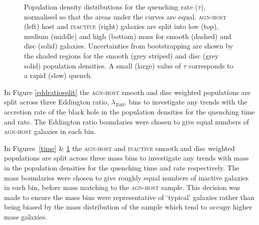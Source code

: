 \begin{figure}
\caption[Quenching rate population density distributions for the \textsc{agn-host} and \textsc{inactive} samples]{Population density distributions for the quenching rate ($\tau$), normalised so that the areas under the curves are equal. \textsc{agn-host} (left) host and \textsc{inactive} (right) galaxies are split into low (top), medium (middle) and high (bottom) mass for smooth (dashed) and disc (solid) galaxies. Uncertainties from bootstrapping are shown by the shaded regions for the smooth (grey striped) and disc (grey solid) population densities. A small (large) value of $\tau$ corresponds to a rapid (slow) quench.}
\label{rate}
\end{figure}



In Figure \ref{eddratiosplit} the \textsc{agn-host} smooth and disc weighted populations are split across three Eddington ratio, $\lambda_{Edd}$, bins to investigate any trends with the accretion rate of the black hole in the population densities for the quenching time and rate. The Eddington ratio boundaries were chosen to give equal numbers of \textsc{agn-host} galaxies in each bin. 

In Figures~\ref{time} \& \ref{rate} the \textsc{agn-host} and \textsc{inactive} smooth and disc weighted populations are split across three mass bins to investigate any trends with mass in the population densities for the quenching time and rate respectively. The mass boundaries were chosen to give roughly equal numbers of inactive galaxies in each bin, before mass matching to the \textsc{agn-host} sample. This decision was made to ensure the mass bins were representative of `typical' galaxies rather than being biased by the mass distribution of the  sample which tend to occupy higher mass galaxies. 

